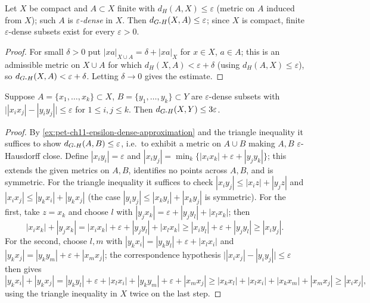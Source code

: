 \begin{example}
  \label{ex:pet-ch11-epsilon-dense-approximation}
  Let $X$ be compact and $A\subset X$ finite with $d_H(A,X)\le\varepsilon$
  (metric on $A$ induced from $X$); such $A$ is \emph{$\varepsilon$-dense} in
  $X$. Then $d_{G\text{-}H}(X,A)\le\varepsilon$; since $X$ is compact, finite
  $\varepsilon$-dense subsets exist for every $\varepsilon>0$.
\end{example}
\begin{proof}
  For small $\delta>0$ put $|xa|_{X\cup A}=\delta+|xa|_X$ for $x\in X$,
  $a\in A$; this is an admissible metric on $X\cup A$ for which
  $d_H(X,A)<\varepsilon+\delta$ (using $d_H(A,X)\le\varepsilon$), so
  $d_{G\text{-}H}(X,A)<\varepsilon+\delta$. Letting $\delta\to0$ gives the estimate.
\end{proof}

\begin{example}
  \label{ex:pet-ch11-finite-approximation-3eps}
  Suppose $A=\{x_1,\dots,x_k\}\subset X$, $B=\{y_1,\dots,y_k\}\subset Y$ are
  $\varepsilon$-dense subsets with
  $\big||x_ix_j|-|y_iy_j|\big|\le\varepsilon$ for $1\le i,j\le k$. Then
  $d_{G\text{-}H}(X,Y)\le3\varepsilon$.
\end{example}
\begin{proof}
  By \cref{ex:pet-ch11-epsilon-dense-approximation} and the triangle
  inequality it suffices to show $d_{G\text{-}H}(A,B)\le\varepsilon$, i.e.\ to exhibit a
  metric on $A\cup B$ making $A,B$ $\varepsilon$-Hausdorff close. Define
  $|x_iy_i|=\varepsilon$ and
  $|x_iy_j|=\min_k\{|x_ix_k|+\varepsilon+|y_jy_k|\}$; this extends the given
  metrics on $A,B$, identifies no points across $A,B$, and is symmetric. For
  the triangle inequality it suffices to check
  $|x_iy_j|\le|x_iz|+|y_jz|$ and $|x_ix_j|\le|y_kx_i|+|y_kx_j|$ (the case
  $|y_iy_j|\le|x_ky_i|+|x_ky_j|$ is symmetric). For the first, take
  $z=x_k$ and choose $l$ with
  $|y_jx_k|=\varepsilon+|y_jy_l|+|x_lx_k|$; then
  \[
    |x_ix_k|+|y_jx_k|=|x_ix_k|+\varepsilon+|y_jy_l|+|x_lx_k|
    \ge|x_iy_l|+\varepsilon+|y_jy_l|\ge|x_iy_j|.
  \]
  For the second, choose $l,m$ with
  $|y_kx_i|=|y_ky_l|+\varepsilon+|x_lx_i|$ and
  $|y_kx_j|=|y_ky_m|+\varepsilon+|x_mx_j|$; the correspondence hypothesis
  $\big||x_ix_j|-|y_iy_j|\big|\le\varepsilon$ then gives
  \[
    |y_kx_i|+|y_kx_j|
    =|y_ky_l|+\varepsilon+|x_lx_i|+|y_ky_m|+\varepsilon+|x_mx_j|
    \ge|x_kx_l|+|x_lx_i|+|x_kx_m|+|x_mx_j|\ge|x_ix_j|,
  \]
  using the triangle inequality in $X$ twice on the last step.
\end{proof}

